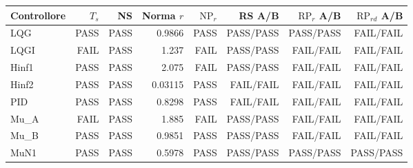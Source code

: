 \begin{tabular}{lrrrrrrr}\toprule
Controllore & $T_s$ & NS & Norma $r$ & $\mathrm{NP}_r$ & RS A/B & $\mathrm{RP}_r$ A/B & $\mathrm{RP}_{rd}$ A/B\\\midrule
LQG & PASS & PASS & \num{0.9866} & PASS & PASS/PASS & PASS/PASS & FAIL/FAIL\\
LQGI & FAIL & PASS & \num{1.237} & FAIL & PASS/PASS & FAIL/FAIL & FAIL/FAIL\\
Hinf1 & PASS & PASS & \num{2.075} & FAIL & PASS/PASS & FAIL/FAIL & FAIL/FAIL\\
Hinf2 & PASS & PASS & \num{0.03115} & PASS & FAIL/FAIL & FAIL/FAIL & FAIL/FAIL\\
PID & PASS & PASS & \num{0.8298} & PASS & FAIL/FAIL & FAIL/FAIL & FAIL/FAIL\\
Mu\_A & FAIL & PASS & \num{1.885} & FAIL & PASS/PASS & FAIL/FAIL & FAIL/FAIL\\
Mu\_B & PASS & PASS & \num{0.9851} & PASS & PASS/PASS & FAIL/FAIL & FAIL/FAIL\\
MuN1 & PASS & PASS & \num{0.5978} & PASS & PASS/PASS & PASS/PASS & PASS/PASS\\
\bottomrule\end{tabular}
